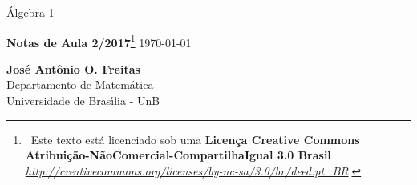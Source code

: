 \begin{titlepage}
\begin{center}
\vspace*{-1.5cm}

Álgebra 1


\vspace*{3.5cm}

{\fontsize{14pt}{14pt}\selectfont
   \textbf{Notas de Aula 2/2017}\footnote{\ccbyncsa\ Este texto está licenciado sob uma \textbf{Licen\c{c}a Creative Commons Atribuição-N\~aoComercial-CompartilhaIgual 3.0 Brasil} \href{http://creativecommons.org/licenses/by-nc-sa/3.0/br/deed.pt\_BR}{\textit{http://creativecommons.org/licenses/by-nc-sa/3.0/br/deed.pt\_BR}}.} \today
   }


\vfill

{\fontsize{14pt}{14pt}\selectfont\textbf{Jos\'e Ant\^onio O. Freitas}\\ Departamento de Matem\'atica\\Universidade de Bras{\'\i}lia - UnB}
\end{center}
\end{titlepage}
\vspace*{-2cm}